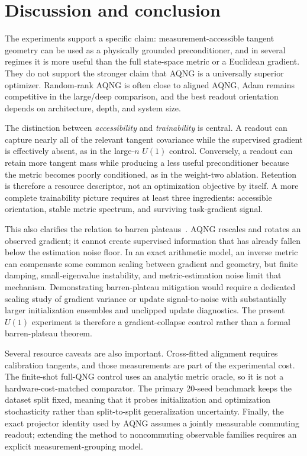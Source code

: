\section{Discussion and conclusion}

The experiments support a specific claim: measurement-accessible tangent geometry can be used as a physically grounded preconditioner, and in several regimes it is more useful than the full state-space metric or a Euclidean gradient. They do not support the stronger claim that AQNG is a universally superior optimizer. Random-rank AQNG is often close to aligned AQNG, Adam remains competitive in the large/deep comparison, and the best readout orientation depends on architecture, depth, and system size.

The distinction between \emph{accessibility} and \emph{trainability} is central. A readout can capture nearly all of the relevant tangent covariance while the supervised gradient is effectively absent, as in the large-$n$ $U(1)$ control. Conversely, a readout can retain more tangent mass while producing a less useful preconditioner because the metric becomes poorly conditioned, as in the weight-two ablation. Retention is therefore a resource descriptor, not an optimization objective by itself. A more complete trainability picture requires at least three ingredients: accessible orientation, stable metric spectrum, and surviving task-gradient signal.

This also clarifies the relation to barren plateaus~\cite{McClean2018}. AQNG rescales and rotates an observed gradient; it cannot create supervised information that has already fallen below the estimation noise floor. In an exact arithmetic model, an inverse metric can compensate some common scaling between gradient and geometry, but finite damping, small-eigenvalue instability, and metric-estimation noise limit that mechanism. Demonstrating barren-plateau mitigation would require a dedicated scaling study of gradient variance or update signal-to-noise with substantially larger initialization ensembles and unclipped update diagnostics. The present $U(1)$ experiment is therefore a gradient-collapse control rather than a formal barren-plateau theorem.

Several resource caveats are also important. Cross-fitted alignment requires calibration tangents, and those measurements are part of the experimental cost. The finite-shot full-QNG control uses an analytic metric oracle, so it is not a hardware-cost-matched comparator. The primary 20-seed benchmark keeps the dataset split fixed, meaning that it probes initialization and optimization stochasticity rather than split-to-split generalization uncertainty. Finally, the exact projector identity used by AQNG assumes a jointly measurable commuting readout; extending the method to noncommuting observable families requires an explicit measurement-grouping model.

